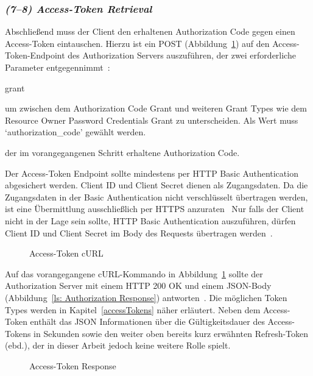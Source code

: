\subsubsection{\textit{(7--8) Access-Token Retrieval}} Abschließend muss der
Client den erhaltenen Authorization Code gegen einen Access-Token eintauschen.
Hierzu ist ein POST (Abbildung~\ref{ls: Access-Token cURL}) auf den
Access-Token-Endpoint des Authorization Servers auszuführen, der zwei
erforderliche Parameter entgegennimmt~:

\begin{labeling}{grant}
    \item [grant\_type] um zwischen dem Authorization Code Grant und
    weiteren Grant Types wie dem Resource Owner Password Credentials Grant
    zu unterscheiden. Als Wert muss `authorization\_code' gewählt werden.
    \item [code] der im vorangegangenen Schritt erhaltene Authorization
    Code.
\end{labeling}
Der Access-Token Endpoint sollte mindestens per HTTP Basic Authentication
abgesichert werden. Client ID und Client Secret dienen als Zugangsdaten. Da die
Zugangsdaten in der Basic Authentication nicht verschlüsselt übertragen werden,
ist eine Übermittlung ausschließlich per HTTPS
anzuraten~ Nur falls der Client nicht in der
Lage sein sollte, HTTP Basic Authentication auszuführen, dürfen Client ID und
Client Secret im Body des Requests übertragen werden~.

\begin{figure}[h]
    \scalebox{.8}{
        
    }
    \caption{Access-Token
    cURL~\protect{}}\label{ls: Access-Token cURL}
\end{figure} \noindent
Auf das vorangegangene cURL-Kommando in Abbildung~\ref{ls: Access-Token cURL}
sollte der Authorization Server mit einem HTTP 200 OK und einem JSON-Body
(Abbildung~\ref{ls: Authorization Response}) antworten~.
Die möglichen Token Types werden in Kapitel~\ref{accessTokens} näher erläutert.
Neben dem Access-Token enthält das JSON Informationen über die Gültigkeitsdauer
des Access-Tokens in Sekunden sowie den weiter oben bereits kurz erwähnten
Refresh-Token (ebd.), der in dieser Arbeit jedoch keine weitere Rolle spielt.

\begin{figure}[h]
    \scalebox{.8}{
        
    }
    \caption{Access-Token
    Response~\protect{}}\label{ls: Access-Token Response}
\end{figure}

